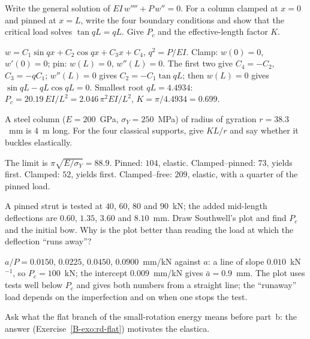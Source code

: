 
\q Write the general solution of $EI\,w'''' + P\,w'' = 0$. For a column clamped at $x = 0$ and
pinned at $x = L$, write the four boundary conditions and show that the critical load solves
$\tan qL = qL$. Give $P_c$ and the effective-length factor $K$.
\begin{answer}
$w = C_1\sin qx + C_2\cos qx + C_3x + C_4$, $q^2 = P/EI$. Clamp: $w(0) = 0$, $w'(0) = 0$; pin:
$w(L) = 0$, $w''(L) = 0$. The first two give $C_4 = -C_2$, $C_3 = -qC_1$; $w''(L) = 0$ gives
$C_2 = -C_1\tan qL$; then $w(L) = 0$ gives $\sin qL - qL\cos qL = 0$. Smallest root
$qL = 4.4934$: $P_c = 20.19\,EI/L^2 = 2.046\,\pi^2EI/L^2$, $K = \pi/4.4934 = 0.699$.
\end{answer}

\q A steel column ($E = 200$~GPa, $\sigma_Y = 250$~MPa) of radius of gyration $r = 38.3$~mm is
$4$~m long. For the four classical supports, give $KL/r$ and say whether it buckles elastically.
\begin{answer}
The limit is $\pi\sqrt{E/\sigma_Y} = 88.9$. Pinned: $104$, elastic. Clamped--pinned: $73$, yields first.
Clamped: $52$, yields first. Clamped--free: $209$, elastic, with a quarter of the pinned load.
\end{answer}

\q A pinned strut is tested at $40$, $60$, $80$ and $90$~kN; the added mid-length deflections are
$0.60$, $1.35$, $3.60$ and $8.10$~mm. Draw Southwell's plot and find $P_c$ and the initial bow.
Why is the plot better than reading the load at which the deflection ``runs away''?
\begin{answer}
$a/P = 0.0150$, $0.0225$, $0.0450$, $0.0900$~mm/kN against $a$: a line of slope $0.010$~kN$^{-1}$, so
$P_c = 100$~kN; the intercept $0.009$~mm/kN gives $\bar a = 0.9$~mm. The plot uses tests well below $P_c$
and gives both numbers from a straight line; the ``runaway'' load depends on the imperfection and
on when one stops the test.
\end{answer}

\begin{instructor}
Ask what the flat branch of the small-rotation energy means before part~b: the answer
(Exercise~\ref{B-exo:rd-flat}) motivates the elastica.
\end{instructor}



